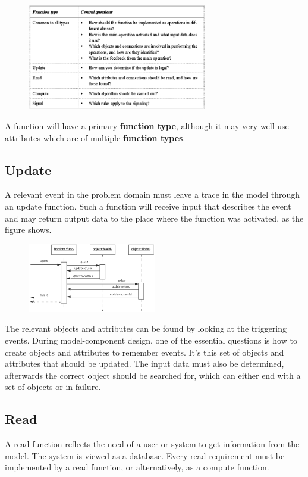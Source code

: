 \begin{figure}[H]
    \centering
    \includegraphics[width=0.7\textwidth]{figures/functioncomponentcentralquestions.png}
\end{figure}

A function will have a primary \textbf{function type}, although it may very well use attributes which are of multiple \textbf{function types}. 

\subsection{Update}
A relevant event in the problem domain must leave a trace in the model through an update function. Such a function will receive input that describes the event and may return output data to the place where the function was activated, as the figure shows.

\begin{figure}[H]
    \centering
    \includegraphics[width=0.5\textwidth]{figures/functioncomponentupdate.png}
\end{figure}

The relevant objects and attributes can be found by looking at the triggering events. During model-component design, one of the essential questions is how to create objects and attributes to remember events. It's this set of objects and attributes that should be updated. The input data must also be determined, afterwards the correct object should be searched for, which can either end with a set of objects or in failure.

\subsection{Read}
A read function reflects the need of a user or system to get information from the model. The system is viewed as a database. Every read requirement must be implemented by a read function, or alternatively, as a compute function.

